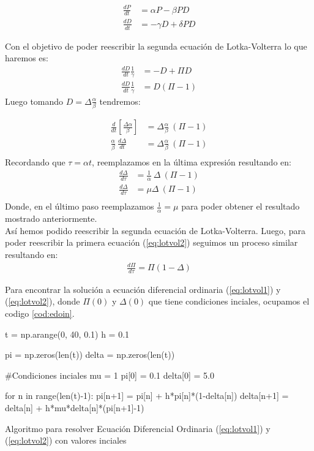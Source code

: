 \documentclass[../portafolio.tex]{subfiles}
\begin{document}
			\begin{align}				
				\frac{dP}{dt} &= \alpha P - \beta PD  \label{eq:lotvol1} \\
				\frac{dD}{dt} &= - \gamma D + \delta PD \label{eq:lotvol2}
			\end{align} 

Con el objetivo de poder reescribir la segunda ecuaci\'on de Lotka-Volterra lo que haremos es:
	\begin{align*}
		\frac{dD}{dt} \frac{1}{\gamma} &= -D + \Pi D \\
		\frac{dD}{dt} \frac{1}{\gamma} &= D(\Pi -1)
	\end{align*}
Luego tomando $ D = \Delta \frac{\alpha}{\beta}$ tendremos:

	\begin{align*}
		\frac{d}{dt}\left[ \frac{\Delta \alpha}{\beta} \right] &= \Delta \frac{\alpha}{\beta}~(\Pi - 1) \\
		\frac{\alpha}{\beta} ~ \frac{d \Delta}{dt} &= \Delta \frac{\alpha}{\beta} ~(\Pi -1) \\
	\end{align*}
Recordando que $\tau = \alpha t$, reemplazamos en la \'ultima expresi\'on resultando en:
	\begin{align*}
	\frac{d \Delta}{d \tau} &= \frac{1}{\alpha} ~ \Delta ~  (\Pi -1) \\
	\frac{d \Delta}{d \tau} &= \mu \Delta ~ (\Pi -1) \\
	\end{align*}
Donde, en el \'ultimo paso reemplazamos $\frac{1}{\alpha} = \mu$ para poder obtener el resultado mostrado anteriormente. \\
As\'i hemos podido reescribir la segunda ecuaci\'on de Lotka-Volterra. Luego, para poder reescribir la primera ecuaci\'on (\ref{eq:lotvol2}) seguimos un proceso similar resultando en: 
	\begin{align*}
		\frac{d \Pi}{d \tau} = \Pi(1- \Delta)
	\end{align*}
	
Para encontrar la soluci\'on a ecuaci\'on diferencial ordinaria (\ref{eq:lotvol1}) y (\ref{eq:lotvol2}), donde $\Pi (0)$ y $\Delta(0)$ que tiene condiciones inciales, ocupamos el codigo \ref{cod:edoin}.

\begin{listing}
	\begin{pythoncode}
t = np.arange(0, 40, 0.1)
h = 0.1 

pi = np.zeros(len(t))
delta = np.zeros(len(t))

#Condiciones inciales 
mu = 1
pi[0] = 0.1
delta[0] = 5.0

for n in range(len(t)-1):
    pi[n+1] = pi[n] + h*pi[n]*(1-delta[n])
    delta[n+1] = delta[n] + h*mu*delta[n]*(pi[n+1]-1)
    \end{pythoncode}
    \caption{Algoritmo para resolver Ecuaci\'on Diferencial Ordinaria (\ref{eq:lotvol1}) y (\ref{eq:lotvol2}) con valores inciales}
	\label{cod:edoin}
\end{listing}
\end{document}
